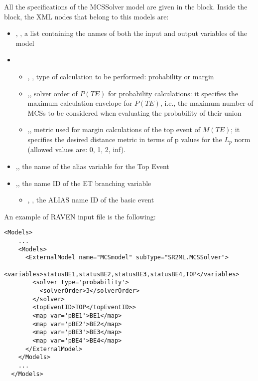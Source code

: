 All the specifications of the MCSSolver model are given in the  block. 
Inside the  block, the XML nodes that belong to this models are:
\begin{itemize}
  \item  {}, , a list containing the names of both the input and output variables of the model
  \item  {}
	  \begin{itemize}
	    \item {}, , type of calculation to be performed: probability or margin
	  
        \item {},, solver order of $P(TE)$ for probability calculations: it specifies the 
                                                                           maximum calculation envelope for $P(TE)$, i.e., the maximum number of MCSs 
                                                                           to be considered when evaluating the probability of their union
         \item {},, metric used for margin calculations of the top event of $M(TE)$; it specifies the
                                                                      desired distance metric in terms of p values for the $L_p$ norm (allowed values 
                                                                      are: 0, 1, 2, inf).
      \end{itemize}
  \item  {},, the name of the alias variable for the Top Event
  \item  {},, the name ID of the ET branching variable
	  \begin{itemize}
	    \item {}, , the ALIAS name ID of the basic event
	  \end{itemize}
\end{itemize}

An example of RAVEN input file is the following:

\begin{lstlisting}[style=XML,morekeywords={anAttribute},caption=MCSSolver model input example., label=lst:MCSSolver_InputExample]
  <Models> 
    ...
    <Models>
      <ExternalModel name="MCSmodel" subType="SR2ML.MCSSolver">
        <variables>statusBE1,statusBE2,statusBE3,statusBE4,TOP</variables>
        <solver type='probability'> 
          <solverOrder>3</solverOrder>
        </solver> 
        <topEventID>TOP</topEventID>>
        <map var='pBE1'>BE1</map>
        <map var='pBE2'>BE2</map>
        <map var='pBE3'>BE3</map>
        <map var='pBE4'>BE4</map>
      </ExternalModel>
    </Models>
    ...
  </Models>
\end{lstlisting}

